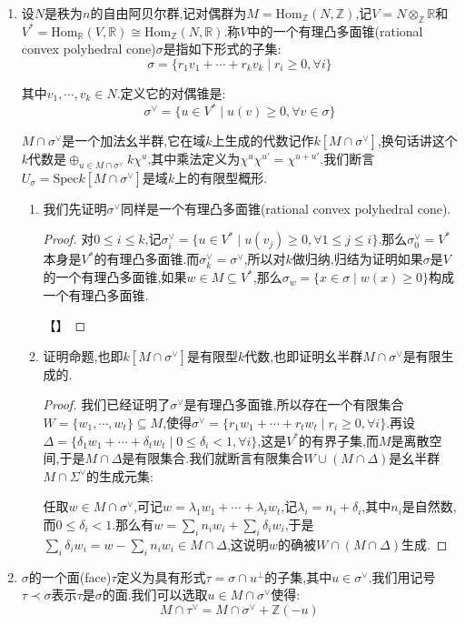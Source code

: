 \begin{enumerate}
	\item 设$N$是秩为$n$的自由阿贝尔群,记对偶群为$M=\mathrm{Hom}_{\mathbb{Z}}(N,\mathbb{Z})$,记$V=N\otimes_{\mathbb{Z}}\mathbb{R}$和$V^*=\mathrm{Hom}_{\mathbb{R}}(V,\mathbb{R})\cong\mathrm{Hom}_{\mathbb{Z}}(N,\mathbb{R})$.称$V$中的一个有理凸多面锥(rational convex polyhedral cone)$\sigma$是指如下形式的子集:
	$$\sigma=\{r_1v_1+\cdots+r_kv_k\mid r_i\ge0,\forall i\}$$
	
	其中$v_1,\cdots,v_k\in N$.定义它的对偶锥是:
	$$\sigma^{\vee}=\{u\in V^*\mid u(v)\ge0,\forall v\in\sigma\}$$
	
	$M\cap\sigma^{\vee}$是一个加法幺半群,它在域$k$上生成的代数记作$k[M\cap\sigma^{\vee}]$,换句话讲这个$k$代数是$\oplus_{u\in M\cap\sigma^{\vee}}k\chi^u$,其中乘法定义为$\chi^u\chi^{u'}=\chi^{u+u'}$.我们断言$U_{\sigma}=\mathrm{Spec}k[M\cap\sigma^{\vee}]$是域$k$上的有限型概形.
	\begin{enumerate}[(1)]
		\item 我们先证明$\sigma^{\vee}$同样是一个有理凸多面锥(rational convex polyhedral cone).
		\begin{proof}
			
			对$0\le i\le k$,记$\sigma^{\vee}_i=\{u\in V^*\mid u(v_j)\ge0,\forall 1\le j\le i\}$.那么$\sigma^{\vee}_0=V^*$本身是$V^*$的有理凸多面锥.而$\sigma^{\vee}_k=\sigma^{\vee}$,所以对$k$做归纳,归结为证明如果$\sigma$是$V$的一个有理凸多面锥,如果$w\in M\subseteq V^*$,那么$\sigma_w=\{x\in\sigma\mid w(x)\ge0\}$构成一个有理凸多面锥.
			
			【】
		\end{proof}
		\item 证明命题,也即$k[M\cap\sigma^{\vee}]$是有限型$k$代数,也即证明幺半群$M\cap\sigma^{\vee}$是有限生成的.
		\begin{proof}
			
			我们已经证明了$\sigma^{\vee}$是有理凸多面锥,所以存在一个有限集合$W=\{w_1,\cdots,w_t\}\subseteq M$,使得$\sigma^{\vee}=\{r_1w_1+\cdots+r_tw_t\mid r_i\ge0,\forall i\}$.再设$\Delta=\{\delta_1w_1+\cdots+\delta_tw_t\mid0\le\delta_i<1,\forall i\}$,这是$V^*$的有界子集,而$M$是离散空间,于是$M\cap\Delta$是有限集合.我们就断言有限集合$W\cup(M\cap\Delta)$是幺半群$M\cap\Sigma^{\vee}$的生成元集:
			
			\qquad
			
			任取$w\in M\cap\sigma^{\vee}$,可记$w=\lambda_1w_1+\cdots+\lambda_tw_t$,记$\lambda_i=n_i+\delta_i$,其中$n_i$是自然数,而$0\le\delta_i<1$.那么有$w=\sum_in_iw_i+\sum_i\delta_iw_i$,于是$\sum_i\delta_iw_i=w-\sum_in_iw_i\in M\cap\Delta$,这说明$w$的确被$W\cap(M\cap\Delta)$生成.
		\end{proof}
	\end{enumerate}
	\item $\sigma$的一个面(face)$\tau$定义为具有形式$\tau=\sigma\cap u^{\perp}$的子集,其中$u\in\sigma^{\vee}$.我们用记号$\tau\prec\sigma$表示$\tau$是$\sigma$的面.我们可以选取$u\in M\cap\sigma^{\vee}$使得:
	$$M\cap\tau^{\vee}=M\cap\sigma^{\vee}+\mathbb{Z}(-u)$$
	

\end{enumerate}
